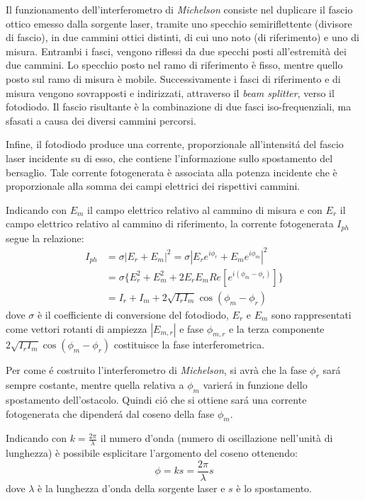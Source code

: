 Il funzionamento dell'interferometro di \textit{Michelson} consiste nel duplicare il fascio ottico emesso dalla sorgente laser, tramite uno specchio semiriflettente (divisore di fascio), in due cammini ottici distinti, di cui uno noto (di riferimento) e uno di misura. Entrambi i fasci, vengono riflessi da due specchi posti all'estremità dei due cammini. Lo specchio posto nel ramo di riferimento è fisso, mentre quello posto sul ramo di misura è mobile. Successivamente i fasci di riferimento e di misura vengono sovrapposti e indirizzati, attraverso il \textit{beam splitter}, verso il fotodiodo. Il fascio risultante è la combinazione di due fasci iso-frequenziali, ma sfasati a causa dei diversi cammini percorsi.

Infine, il fotodiodo produce una corrente, proporzionale all'intensitá del fascio laser incidente su di esso, che contiene l'informazione sullo spostamento del bersaglio. Tale corrente fotogenerata è associata alla potenza incidente che è proporzionale alla somma dei campi elettrici dei rispettivi cammini.

Indicando con ${E_m}$ il campo elettrico relativo al cammino di misura e con ${E_r}$ il campo elettrico relativo al cammino di riferimento, la corrente fotogenerata $I_{ph}$ segue la relazione:
\begin{equation}
\begin{split}
	I_{ph}&=\sigma|E_r+E_m|^2=\sigma|E_re^{i\phi_r}+E_me^{i\phi_m}|^2\\
	&=\sigma\{E_r^2+E_m^2+2E_rE_mRe[e^{i(\phi_m-\phi_r)}]\}\\
	&=I_r+I_m+2\sqrt{I_rI_m}\cos{(\phi_m-\phi_r)}
\end{split}
\end{equation}
dove $\sigma$ è il coefficiente di conversione del fotodiodo, $E_r$ e $E_m$ sono rappresentati come vettori rotanti di ampiezza $|E_{m,r}|$ e fase $\phi_{m,r}$ e la terza componente $2\sqrt{I_rI_m}\cos{(\phi_m-\phi_r)}$ costituisce la fase interferometrica. 

Per come é costruito l'interferometro di \textit{Michelson}, si avrà che la fase $\phi_r$ sará sempre costante, mentre quella relativa a $\phi_m$ varierá in funzione dello spostamento dell'ostacolo. Quindi ció che si ottiene sará una corrente fotogenerata che dipenderá dal coseno della fase $\phi_m$. 

Indicando con $k=\frac{2\pi}{\lambda}$ il numero d'onda (numero di oscillazione nell'unità di lunghezza) è possibile esplicitare l'argomento del coseno ottenendo:
\begin{equation}
	\phi=ks=\frac{2\pi}{\lambda}s	
\end{equation}
dove $\lambda$ è la lunghezza d'onda della sorgente laser e $s$ è lo spostamento.

